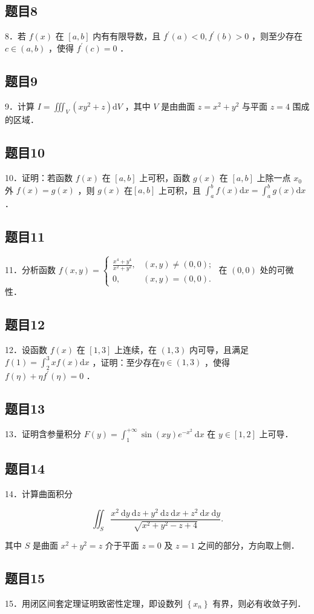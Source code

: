 \documentclass{article}
\begin{document}
\subsection{题目8}
8．若 \(f(x)\) 在 \([a, b]\) 内有有限导数，且 \(f^{\prime}(a)<0, f^{\prime}(b)>0\) ，则至少存在 \(c \in(a, b)\) ，使得 \(f^{\prime}(c)=0\) ．

\subsection{题目9}
9．计算 \(I=\iiint_{V}\left(x y^{2}+z\right) \mathrm{d} V\) ，其中 \(V\) 是由曲面 \(z=x^{2}+y^{2}\) 与平面 \(z=4\) 围成的区域．

\subsection{题目10}
10．证明：若函数 \(f(x)\) 在 \([a, b]\) 上可积，函数 \(g(x)\) 在 \([a, b]\) 上除一点 \(x_{0}\) 外 \(f(x)=g(x)\) ，则 \(g(x)\) 在\([a, b]\) 上可积，且 \(\int_{a}^{b} f(x) \mathrm{d} x=\int_{a}^{b} g(x) \mathrm{d} x\) ．

\subsection{题目11}
11．分析函数 \(f(x, y)=\left\{\begin{array}{ll}\frac{x^{4}+y^{4}}{x^{2}+y^{2}}, & (x, y) \neq(0,0) ; \\ 0, & (x, y)=(0,0) .\end{array}\right.\) 在 \((0,0)\) 处的可微性．

\subsection{题目12}
12．设函数 \(f(x)\) 在 \([1,3]\) 上连续，在 \((1,3)\) 内可导，且满足 \(f(1)=\int_{2}^{3} x f(x) \mathrm{d} x\) ，证明：至少存在\(\eta \in(1,3)\) ，使得 \(f(\eta)+\eta f^{\prime}(\eta)=0\) ．

\subsection{题目13}
13．证明含参量积分 \(F(y)=\int_{1}^{+\infty} \sin (x y) e^{-x^{2}} \mathrm{~d} x\) 在 \(y \in[1,2]\) 上可导．

\subsection{题目14}
14．计算曲面积分

\[
\iint_{S} \frac{x^{2} \mathrm{~d} y \mathrm{~d} z+y^{2} \mathrm{~d} z \mathrm{~d} x+z^{2} \mathrm{~d} x \mathrm{~d} y}{\sqrt{x^{2}+y^{2}-z+4}} .
\]

其中 \(S\) 是曲面 \(x^{2}+y^{2}=z\) 介于平面 \(z=0\) 及 \(z=1\) 之间的部分，方向取上侧．

\subsection{题目15}
15．用闭区间套定理证明致密性定理，即设数列 \(\left\{x_{n}\right\}\) 有界，则必有收敛子列．
\end{document}
